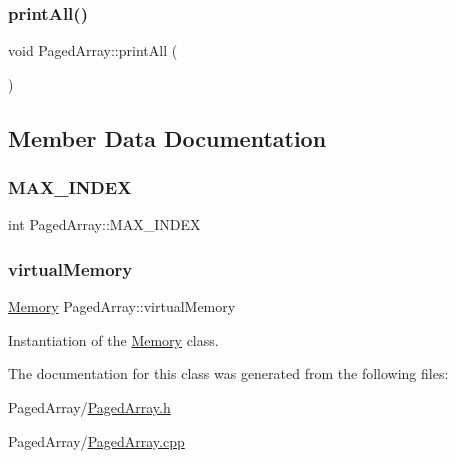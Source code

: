 \mbox{\label{classPagedArray_a5fc2ba5b86eba79384cdb03956db1e14}} 
\subsubsection{\texorpdfstring{print\+All()}{printAll()}}
{\footnotesize\ttfamily void Paged\+Array\+::print\+All (\begin{DoxyParamCaption}{ }\end{DoxyParamCaption})}



\subsection{Member Data Documentation}
\mbox{\label{classPagedArray_a3e41073f5476d64e7e4eeebb932c997d}} 
\subsubsection{\texorpdfstring{M\+A\+X\+\_\+\+I\+N\+D\+EX}{MAX\_INDEX}}
{\footnotesize\ttfamily int Paged\+Array\+::\+M\+A\+X\+\_\+\+I\+N\+D\+EX}

\mbox{\label{classPagedArray_a24dfdb93699ffe361b29d43b0f78ecf1}} 
\subsubsection{\texorpdfstring{virtual\+Memory}{virtualMemory}}
{\footnotesize\ttfamily \mbox{\hyperlink{classMemory}{Memory}} Paged\+Array\+::virtual\+Memory}



Instantiation of the \mbox{\hyperlink{classMemory}{Memory}} class. 



The documentation for this class was generated from the following files\+:\begin{DoxyCompactItemize}
\item 
Paged\+Array/\mbox{\hyperlink{PagedArray_8h}{Paged\+Array.\+h}}\item 
Paged\+Array/\mbox{\hyperlink{PagedArray_8cpp}{Paged\+Array.\+cpp}}\end{DoxyCompactItemize}
